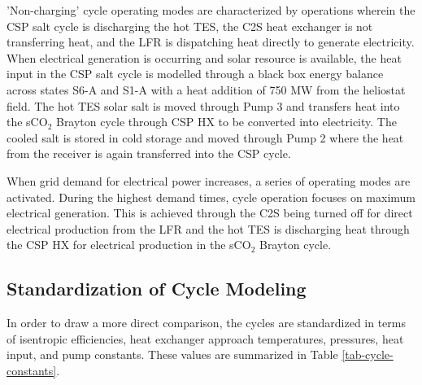 'Non-charging' cycle operating modes are characterized by operations wherein the CSP salt cycle is discharging the hot TES, the C2S heat exchanger is not transferring heat, and the LFR is dispatching heat directly to generate electricity. When electrical generation is occurring and solar resource is available, the heat input in the CSP salt cycle is modelled through a black box energy balance across states S6-A and S1-A with a heat addition of 750 MW from the heliostat field. The hot TES solar salt is moved through Pump 3 and transfers heat into the sCO$_{2}$ Brayton cycle through CSP HX to be converted into electricity. The cooled salt is stored in cold storage and moved through Pump 2 where the heat from the receiver is again transferred into the CSP cycle. 

When grid demand for electrical power increases, a series of operating modes are activated. During the highest demand times, cycle operation focuses on maximum electrical generation. This is achieved through the C2S being turned off for direct electrical production from the LFR and the hot TES is discharging heat through the CSP HX for electrical production in the sCO$_2$ Brayton cycle.  



\subsection{Standardization of Cycle Modeling}


In order to draw a more direct comparison, the cycles are standardized in terms of isentropic efficiencies, heat exchanger approach temperatures, pressures, heat input, and pump constants. These values are summarized in Table \ref{tab-cycle-constants}.

